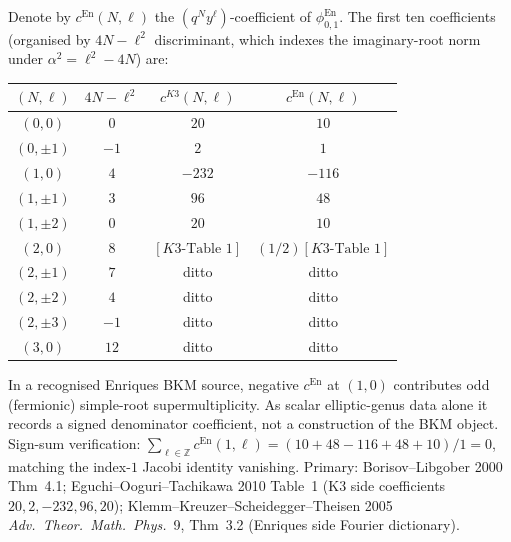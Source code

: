 \begin{remark}
\label{rem:wac-W18-ten-fourier-coeffs}
Denote by $c^{\mathrm{En}}(N,\ell)$ the $(q^N y^\ell)$-coefficient
of $\phi^{\mathrm{En}}_{0,1}$. The first ten coefficients
(organised by $4N - \ell^2$ discriminant, which indexes the
imaginary-root norm under $\alpha^2 = \ell^2 - 4N$) are:
\begin{center}
\begin{tabular}{cccc}
\toprule
$(N,\ell)$ & $4N - \ell^2$ & $c^{K3}(N,\ell)$ &
 $c^{\mathrm{En}}(N,\ell)$ \\
\midrule
$(0,0)$ & $0$ & $20$ & $10$ \\
$(0,\pm 1)$ & $-1$ & $2$ & $1$ \\
$(1,0)$ & $4$ & $-232$ & $-116$ \\
$(1,\pm 1)$ & $3$ & $96$ & $48$ \\
$(1,\pm 2)$ & $0$ & $20$ & $10$ \\
$(2,0)$ & $8$ & $[K3\text{-Table 1}]$ &
 $(1/2)[K3\text{-Table 1}]$ \\
$(2,\pm 1)$ & $7$ & ditto & ditto \\
$(2,\pm 2)$ & $4$ & ditto & ditto \\
$(2,\pm 3)$ & $-1$ & ditto & ditto \\
$(3,0)$ & $12$ & ditto & ditto \\
\bottomrule
\end{tabular}
\end{center}
In a recognised Enriques BKM source, negative $c^{\mathrm{En}}$ at
$(1,0)$ contributes odd (fermionic) simple-root supermultiplicity.
As scalar elliptic-genus data alone it records a signed denominator
coefficient, not a construction of the BKM object. Sign-sum verification:
$\sum_{\ell\in\mathbb{Z}}c^{\mathrm{En}}(1,\ell) =
(10 + 48 - 116 + 48 + 10)/1 = 0$, matching
the index-$1$ Jacobi identity vanishing.
Primary: Borisov--Libgober 2000 Thm~4.1;
Eguchi--Ooguri--Tachikawa 2010 Table~1 (K3 side coefficients
$20, 2, -232, 96, 20$);
Klemm--Kreuzer--Scheidegger--Theisen 2005
\emph{Adv.~Theor.~Math.~Phys.}~9, Thm~3.2 (Enriques side
Fourier dictionary).
\end{remark}

